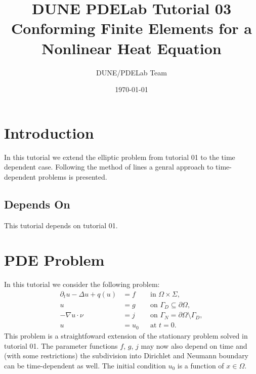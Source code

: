 \documentclass[a4paper,12pt]{article}
\title{DUNE PDELab Tutorial 03 \\
Conforming Finite Elements for a\\ Nonlinear Heat Equation}
\author{DUNE/PDELab Team}
\date{\today}
\begin{document}
\maketitle
\tableofcontents
\clearpage

\section{Introduction}

In this tutorial we extend the elliptic problem from tutorial 01 to the
time dependent case. Following the method of lines a genral approach to time-dependent
problems is presented.

\subsection*{Depends On} This tutorial depends on tutorial 01.

\section{PDE Problem}

In this tutorial we consider the following problem:
\begin{align*}
\partial_t u -\Delta u + q(u) &= f &&\text{in $\Omega\times\Sigma$},\\
u &= g &&\text{on $\Gamma_D\subseteq\partial\Omega$},\\
-\nabla u\cdot \nu &= j &&\text{on $\Gamma_N=\partial\Omega\setminus\Gamma_D$},\\
u &= u_0 &&\text{at $t=0$}.
\end{align*}
This problem is a straightfoward extension of the stationary
problem solved in tutorial 01.
The parameter functions $f$, $g$, $j$ may now also depend on time
and (with some restrictions) the subdivision into Dirichlet and Neumann boundary
can be time-dependent as well. The initial
condition $u_0$ is a function of $x\in\Omega$.
\end{document}
